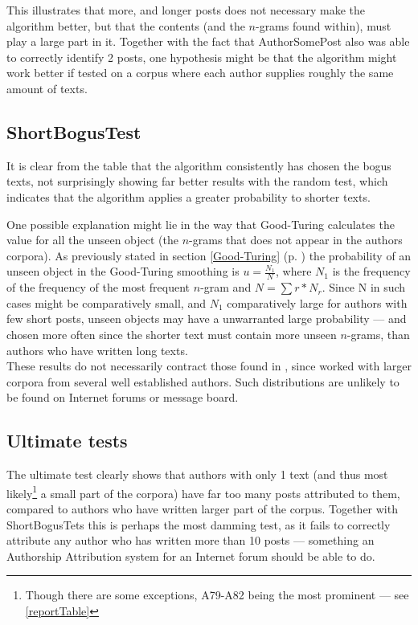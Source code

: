 This illustrates that more, and longer posts does not necessary make the algorithm better, but that the contents (and the $n$-grams found within), must play a large part in it. Together with the fact that AuthorSomePost also was able to correctly identify 2 posts, one hypothesis might be that the algorithm might work better if tested on a corpus where each author supplies roughly the same amount of texts.  

\subsection{ShortBogusTest}
It is clear from the table that the algorithm consistently has chosen the bogus texts, not surprisingly showing far better results with the random test, which indicates that the algorithm applies a greater probability to shorter texts.

One possible explanation might lie in the way that Good-Turing calculates the value for all the unseen object (the $n$-grams that does not appear in the authors corpora). As previously stated in section \ref{Good-Turing} (p. \pageref{Good-Turing}) the probability of an unseen object in the Good-Turing smoothing is $u =\frac{N_1}{N}$, where $N_1$ is the frequency of the frequency of the most frequent $n$-gram and $N =\sum r * N_r$. Since N in such cases might be comparatively small, and $N_1$ comparatively large for authors with few short posts, unseen objects may have a unwarranted large probability --- and chosen more often since the shorter text must contain more unseen $n$-grams, than authors who have written long texts.\\

These results do not necessarily contract those found in \cite{nr4}, since \cite{nr4} worked with larger corpora from several well established authors. Such distributions are unlikely to be found on Internet forums or message board. 

\subsection{Ultimate tests}
The ultimate test clearly shows that authors with only 1 text (and thus most likely\footnote{Though there are some exceptions, A79-A82 being the most prominent --- see \ref{reportTable}} a small part of the corpora) have far too many posts attributed to them, compared to authors who have written larger part of the corpus. Together with ShortBogusTets this is perhaps the most damming test, as it fails to correctly attribute any author who has written more than 10 posts --- something an Authorship Attribution system for an Internet forum should be able to do. 

